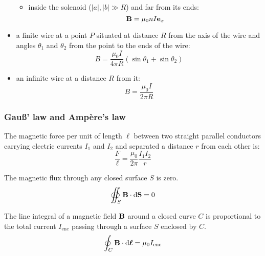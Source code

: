 \documentclass[../../../main.tex]{subfiles}
\begin{document}
\begin{multicols}{2}
\begin{proposition}
\begin{itemize}
\begin{itemize}
\begin{center}
\begin{minipage}{\linewidth}
                      \end{minipage}
                    \end{center}
              \item inside the solenoid ($|a|,|b|\gg R$) and far from its ends: $$\boldsymbol{\mathrm{B}}=\mu_0 nI\boldsymbol{\mathrm{e}}_x$$
            \end{itemize}
      \item a finite wire at a point $P$ situated at distance $R$ from the axis of the wire and angles $\theta_1$ and $\theta_2$ from the point to the ends of the wire: $$B=\frac{\mu_0I}{4\pi R}(\sin\theta_1+\sin\theta_2)$$
            \begin{center}
              \begin{minipage}{\linewidth}
                \centering
                
              \end{minipage}
            \end{center}
      \item an infinite wire at a distance $R$ from it: $$B=\frac{\mu_0I}{2\pi R}$$
    \end{itemize}
  \end{proposition}
  \subsubsection{Gau\ss' law and Ampère's law}
  \begin{proposition}
    The magnetic force per unit of length $\ell$ between two straight parallel conductors carrying electric currents $I_1$ and $I_2$ and separated a distance $r$ from each other is: $$\frac{F}{\ell}=\frac{\mu_0}{2\pi}\frac{I_1I_2}{r}$$
  \end{proposition}
  \begin{law}
    The magnetic flux through any closed surface $S$ is zero.
    $$\oiint_S\boldsymbol{\mathrm{B}}\cdot\dd{\boldsymbol{\mathrm{S}}}=0$$
  \end{law}
  \begin{law}
    The line integral of a magnetic field $\boldsymbol{\mathrm{B}}$ around a closed curve $C$ is proportional to the total current $I_\text{enc}$ passing through a surface $S$ enclosed by $C$.
    $$\oint_C\boldsymbol{\mathrm{B}}\cdot\dd{\boldsymbol{\mathrm{\ell}}}=\mu_0I_\text{enc}$$
  \end{law}

\end{multicols}
\end{document}
